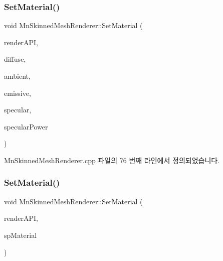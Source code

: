 \mbox{\label{class_m_n_l_1_1_mn_skinned_mesh_renderer_aa8722f1774464897eabece8d0c5bfa8f}} 
\subsubsection{\texorpdfstring{Set\+Material()}{SetMaterial()}\hspace{0.1cm}{\footnotesize\ttfamily [1/2]}}
{\footnotesize\ttfamily void Mn\+Skinned\+Mesh\+Renderer\+::\+Set\+Material (\begin{DoxyParamCaption}\item[{\hyperlink{class_m_n_l_1_1_mn_render_a_p_i}{Mn\+Render\+A\+PI} \&}]{render\+A\+PI,  }\item[{const Direct\+X\+::\+Simple\+Math\+::\+Vector4 \&}]{diffuse,  }\item[{const Direct\+X\+::\+Simple\+Math\+::\+Vector4 \&}]{ambient,  }\item[{const Direct\+X\+::\+Simple\+Math\+::\+Vector4 \&}]{emissive,  }\item[{const Direct\+X\+::\+Simple\+Math\+::\+Vector4 \&}]{specular,  }\item[{float}]{specular\+Power }\end{DoxyParamCaption})}



Mn\+Skinned\+Mesh\+Renderer.\+cpp 파일의 76 번째 라인에서 정의되었습니다.

\mbox{\label{class_m_n_l_1_1_mn_skinned_mesh_renderer_a19733cdda9d641852988b00351b3edcf}} 
\subsubsection{\texorpdfstring{Set\+Material()}{SetMaterial()}\hspace{0.1cm}{\footnotesize\ttfamily [2/2]}}
{\footnotesize\ttfamily void Mn\+Skinned\+Mesh\+Renderer\+::\+Set\+Material (\begin{DoxyParamCaption}\item[{\hyperlink{class_m_n_l_1_1_mn_render_a_p_i}{Mn\+Render\+A\+PI} \&}]{render\+A\+PI,  }\item[{const std\+::shared\+\_\+ptr$<$ \hyperlink{class_m_n_l_1_1_mn_material}{Mn\+Material} $>$}]{sp\+Material }\end{DoxyParamCaption})}



